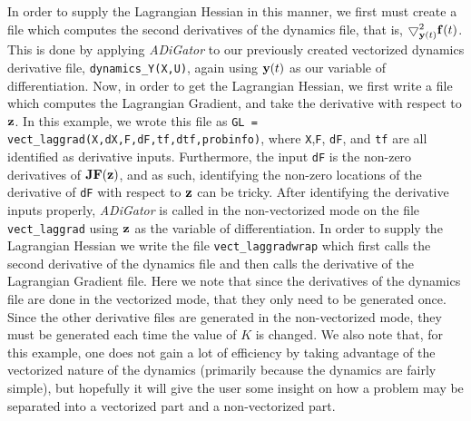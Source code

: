 \documentclass[10pt,pdftex]{article}
\begin{document}
In order to supply the Lagrangian Hessian in this manner, we first must create a file which computes the second derivatives of the dynamics file, that is, $\bigtriangledown^2_{\mathbf{y}(t)}\mathbf{f}(t)$. This is done by applying \emph{ADiGator} to our previously created vectorized dynamics derivative file, \texttt{dynamics\_Y(X,U)}, again using $\mathbf{y}(t)$ as our variable of differentiation. Now, in order to get the Lagrangian Hessian, we first write a file which computes the Lagrangian Gradient, and take the derivative with respect to $\mathbf{z}$. In this example, we wrote this file as \texttt{GL = vect\_laggrad(X,dX,F,dF,tf,dtf,probinfo)}, where \texttt{X},\texttt{F}, \texttt{dF}, and \texttt{tf} are all identified as derivative inputs. Furthermore, the input \texttt{dF} is the non-zero derivatives of $\mathbf{J}\mathbf{F}(\mathbf{z})$, and as such, identifying the non-zero locations of the derivative of \texttt{dF} with respect to $\mathbf{z}$ can be tricky. After identifying the derivative inputs properly, \emph{ADiGator} is called in the non-vectorized mode on the file \texttt{vect\_laggrad} using $\mathbf{z}$ as the variable of differentiation. In order to supply the Lagrangian Hessian we write the file \texttt{vect\_laggradwrap} which first calls the second derivative of the dynamics file and then calls the derivative of the Lagrangian Gradient file. Here we note that since the derivatives of the dynamics file are done in the vectorized mode, that they only need to be generated once. Since the other derivative files are generated in the non-vectorized mode, they must be generated each time the value of $K$ is changed. We also note that, for this example, one does not gain a lot of efficiency by taking advantage of the vectorized nature of the dynamics (primarily because the dynamics are fairly simple), but hopefully it will give the user some insight on how a problem may be separated into a vectorized part and a non-vectorized part.
\end{document}
